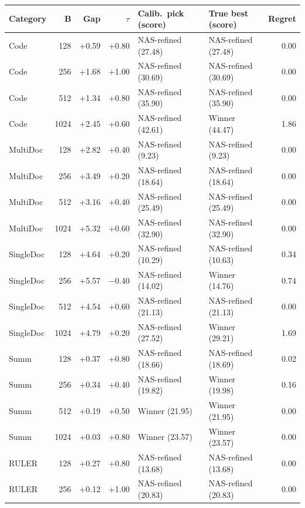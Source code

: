 \begin{table}[t]
  \centering
  \footnotesize
  \setlength{\tabcolsep}{4pt}
  \begin{tabular}{@{}l r r r l l r@{}}
    \toprule
    Category & B & Gap & $\tau$ & Calib.\ pick (score) & True best (score) & Regret \\
    \midrule
    Code & 128 & +0.59 & +0.80 & NAS-refined (27.48) & NAS-refined (27.48) & 0.00 \\
    Code & 256 & +1.68 & +1.00 & NAS-refined (30.69) & NAS-refined (30.69) & 0.00 \\
    Code & 512 & +1.34 & +0.80 & NAS-refined (35.90) & NAS-refined (35.90) & 0.00 \\
    Code & 1024 & +2.45 & +0.60 & NAS-refined (42.61) & Winner (44.47) & 1.86 \\
    MultiDoc & 128 & +2.82 & +0.40 & NAS-refined (9.23) & NAS-refined (9.23) & 0.00 \\
    MultiDoc & 256 & +3.49 & +0.20 & NAS-refined (18.64) & NAS-refined (18.64) & 0.00 \\
    MultiDoc & 512 & +3.16 & +0.40 & NAS-refined (25.49) & NAS-refined (25.49) & 0.00 \\
    MultiDoc & 1024 & +5.32 & +0.60 & NAS-refined (32.90) & NAS-refined (32.90) & 0.00 \\
    SingleDoc & 128 & +4.64 & +0.20 & NAS-refined (10.29) & NAS-refined (10.63) & 0.34 \\
    SingleDoc & 256 & +5.57 & $-$0.40 & NAS-refined (14.02) & Winner (14.76) & 0.74 \\
    SingleDoc & 512 & +4.54 & +0.60 & NAS-refined (21.13) & NAS-refined (21.13) & 0.00 \\
    SingleDoc & 1024 & +4.79 & +0.20 & NAS-refined (27.52) & Winner (29.21) & 1.69 \\
    Summ & 128 & +0.37 & +0.80 & NAS-refined (18.66) & NAS-refined (18.69) & 0.02 \\
    Summ & 256 & +0.34 & +0.40 & NAS-refined (19.82) & Winner (19.98) & 0.16 \\
    Summ & 512 & +0.19 & +0.50 & Winner (21.95) & Winner (21.95) & 0.00 \\
    Summ & 1024 & +0.03 & +0.80 & Winner (23.57) & Winner (23.57) & 0.00 \\
    RULER & 128 & +0.27 & +0.80 & NAS-refined (13.68) & NAS-refined (13.68) & 0.00 \\
    RULER & 256 & +0.12 & +1.00 & NAS-refined (20.83) & NAS-refined (20.83) & 0.00 \\

\end{tabular}
\end{table}
